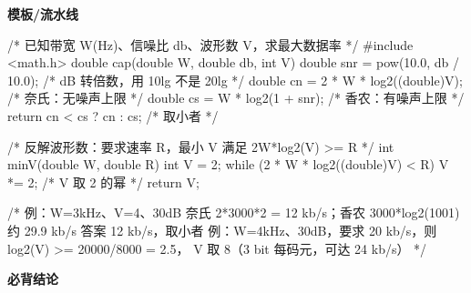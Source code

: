 \documentclass[10pt,a4paper]{ctexart}
\begin{document}

\textbf{模板/流水线}

\begin{codebox}
/* 已知带宽 W(Hz)、信噪比 db、波形数 V，求最大数据率 */
#include <math.h>
double cap(double W, double db, int V) {
    double snr = pow(10.0, db / 10.0);      /* dB 转倍数，用 10lg 不是 20lg */
    double cn  = 2 * W * log2((double)V);   /* 奈氏：无噪声上限 */
    double cs  = W * log2(1 + snr);         /* 香农：有噪声上限 */
    return cn < cs ? cn : cs;               /* 取小者 */
}

/* 反解波形数：要求速率 R，最小 V 满足 2W*log2(V) >= R */
int minV(double W, double R) {
    int V = 2;
    while (2 * W * log2((double)V) < R) V *= 2;   /* V 取 2 的幂 */
    return V;
}

/* 例：W=3kHz、V=4、30dB
   奈氏 2*3000*2 = 12 kb/s；香农 3000*log2(1001) 约 29.9 kb/s
   答案 12 kb/s，取小者
   例：W=4kHz、30dB，要求 20 kb/s，则 log2(V) >= 20000/8000 = 2.5，
       V 取 8（3 bit 每码元，可达 24 kb/s） */
\end{codebox}




\textbf{必背结论}
\end{document}
